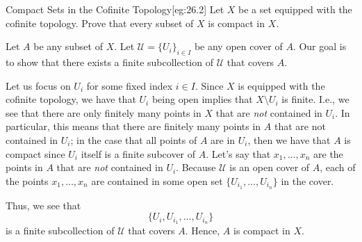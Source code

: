 \begin{egBox}{Compact Sets in the Cofinite Topology}[eg:26.2]
    Let \( X \) be a set equipped with the cofinite topology.
    Prove that every subset of \( X \) is compact in \( X \).

    \baseSkip

    Let \( A \) be any subset of \( X \).
    Let \( \mathcal{U} = \{ U_{ i } \}_{ i \in I } \) be any open cover of 
    \( A \).
    Our goal is to show that there exists a finite subcollection of 
    \( \mathcal{U} \) that covers \( A \).

    \baseSkip

    Let us focus on \( U_{ i } \) for some fixed index \( i \in I \).
    Since \( X \) is equipped with the cofinite topology, we have that 
    \( U_{ i } \) being open implies that \( X \setminus U_{ i } \) is finite.
    I.e., we see that there are only finitely many points in \( X \) that 
    are \textit{not} contained in \( U_{ i } \).
    In particular, this means that there are finitely many points in \( A \)
    that are not contained in \( U_{ i } \); in the case that all points of 
    \( A \) are in \( U_{ i } \), then we have that \( A \) is compact since
    \( U_{ i } \) itself is a finite subcover of \( A \).
    Let's say that \( x_{ 1 } , \ldots , x_{ n } \) are the points in \( A \)
    that are \textit{not} contained in \( U_{ i } \).
    Because \( \mathcal{U} \) is an open cover of \( A \), each of the points 
    \( x_{ 1 } , \ldots , x_{ n } \) are contained in some open set 
    \( \{ U_{ i_{ 1 } } , \ldots , U_{ i_{ n } } \} \) in the cover.

    \baseSkip

    Thus, we see that 
    \begin{equation*}
        \{ U_{ i }, U_{ i_{ 1 } } , \ldots , U_{ i_{ n } } \}
    \end{equation*}
    is a finite subcollection of \( \mathcal{U} \) that covers \( A \).
    Hence, \( A \) is compact in \( X \).
\end{egBox}

